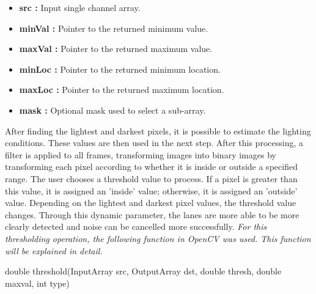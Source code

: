 \begin{itemize}

\item \textbf{src : }Input single channel array.

\item \textbf{minVal : }Pointer to the returned minimum value.

\item \textbf{maxVal : }Pointer to the returned maximum value.

\item \textbf{minLoc : }Pointer to the returned minimum location.

\item \textbf{maxLoc : }Pointer to the returned maximum location.

\item \textbf{mask : }Optional mask used to select a sub-array.

\end{itemize}


After finding the lightest and darkest pixels, it is possible to estimate the lighting conditions. These values are then used in the next step. After this processing, a filter is applied to all frames, transforming images into binary images by transforming each pixel according to whether it is inside or outside a specified range. The user chooses a threshold value to process. If a pixel is greater than this value, it is assigned an 'inside' value; otherwise, it is assigned an 'outside' value. Depending on the lightest and darkest pixel values, the threshold value changes. Through this dynamic parameter, the lanes are more able to be more clearly detected and noise can be cancelled more successfully. \emph{\color{blue}For this thresholding operation, the following function in OpenCV was used. This function will be explained in detail.}\citep{threshold}


\begin{center}

double threshold(InputArray src, OutputArray dst, double thresh, double maxval, int type)

\end{center}

